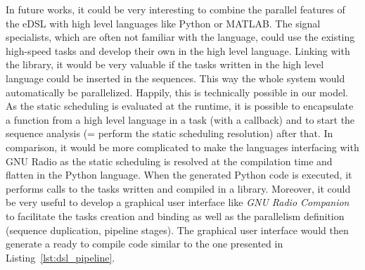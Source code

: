 In future works, it could be very interesting to combine the parallel features
of the \AFFECT eDSL with high level languages like Python or MATLAB. The signal
specialists, which are often not familiar with the \Cxx language, could use the
existing high-speed \Cxx tasks and develop their own in the high level
language. Linking with the \AFFECT library, it would be very valuable if the
tasks written in the high level language could be inserted in the \AFFECT
sequences. This way the whole system would automatically be parallelized.
Happily, this is technically possible in our model. As the static scheduling is
evaluated at the runtime, it is possible to encapsulate a function from a high
level language in a \AFFECT task (with a callback) and to start the sequence
analysis (= perform the static scheduling resolution) after that. In comparison,
it would be more complicated to make the languages interfacing with GNU Radio as
the static scheduling is resolved at the compilation time and flatten in the
Python language. When the generated Python code is executed, it performs calls
to the tasks written and compiled in a \Cxx library. Moreover, it could be very
useful to develop a graphical user interface like \emph{GNU Radio Companion} to
facilitate the tasks creation and binding as well as the parallelism definition
(sequence duplication, pipeline stages). The graphical user interface would then
generate a ready to compile \Cxx code similar to the one presented in
Listing~\ref{lst:dsl_pipeline}.